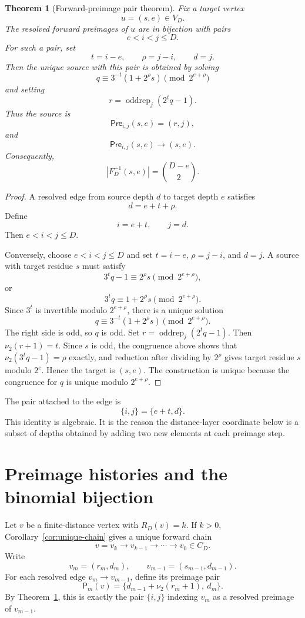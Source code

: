 \documentclass[11pt]{article}
\newtheorem{theorem}{Theorem}[section]
\theoremstyle{definition}
\theoremstyle{remark}
\newcommand{\nuu}{\nu_2}
\newcommand{\Pre}{\mathsf{Pre}}
\newcommand{\Pair}{\mathsf P}
\newcommand{\oddrep}{\operatorname{oddrep}}
\begin{document}
\begin{theorem}[Forward-preimage pair theorem]\label{thm:preimage}
Fix a target vertex
\[
u=(s,e)\in V_D.
\]
The resolved forward preimages of $u$ are in bijection with pairs
\[
e<i<j\le D.
\]
For such a pair, set
\[
t=i-e,
\qquad
\rho=j-i,
\qquad
d=j.
\]
Then the unique source with this pair is obtained by solving
\[
q\equiv3^{-t}(1+2^\rho s)\pmod {2^{e+\rho}}
\]
and setting
\[
r=\oddrep_j(2^tq-1).
\]
Thus the source is
\[
\Pre_{i,j}(s,e)=(r,j),
\]
and
\[
\Pre_{i,j}(s,e)\to(s,e).
\]
Consequently,
\[
|F_D^{-1}(s,e)|=\binom{D-e}{2}.
\]
\end{theorem}

\begin{proof}
A resolved edge from source depth $d$ to target depth $e$ satisfies
\[
d=e+t+\rho.
\]
Define
\[
i=e+t,
\qquad
j=d.
\]
Then $e<i<j\le D$.

Conversely, choose $e<i<j\le D$ and set $t=i-e$, $\rho=j-i$, and $d=j$.  A source with target residue $s$ must satisfy
\[
3^tq-1\equiv2^\rho s\pmod {2^{e+\rho}},
\]
or
\[
3^tq\equiv1+2^\rho s\pmod {2^{e+\rho}}.
\]
Since $3^t$ is invertible modulo $2^{e+\rho}$, there is a unique solution
\[
q\equiv3^{-t}(1+2^\rho s)\pmod {2^{e+\rho}}.
\]
The right side is odd, so $q$ is odd.  Set $r=\oddrep_j(2^tq-1)$.  Then $\nuu(r+1)=t$.  Since $s$ is odd, the congruence above shows that $\nuu(3^tq-1)=\rho$ exactly, and reduction after dividing by $2^\rho$ gives target residue $s$ modulo $2^e$.  Hence the target is $(s,e)$.  The construction is unique because the congruence for $q$ is unique modulo $2^{e+\rho}$.
\end{proof}

The pair attached to the edge is
\[
\{i,j\}=\{e+t,d\}.
\]
This identity is algebraic.  It is the reason the distance-layer coordinate below is a subset of depths obtained by adding two new elements at each preimage step.

\section{Preimage histories and the binomial bijection}\label{sec:histories}

Let $v$ be a finite-distance vertex with $R_D(v)=k$.  If $k>0$, Corollary~\ref{cor:unique-chain} gives a unique forward chain
\[
v=v_k\to v_{k-1}\to\cdots\to v_0\in C_D.
\]
Write
\[
v_m=(r_m,d_m),
\qquad
v_{m-1}=(s_{m-1},d_{m-1}).
\]
For each resolved edge $v_m\to v_{m-1}$, define its preimage pair
\[
\Pair_m(v)=\{d_{m-1}+\nuu(r_m+1),\ d_m\}.
\]
By Theorem~\ref{thm:preimage}, this is exactly the pair $\{i,j\}$ indexing $v_m$ as a resolved preimage of $v_{m-1}$.
\end{document}
